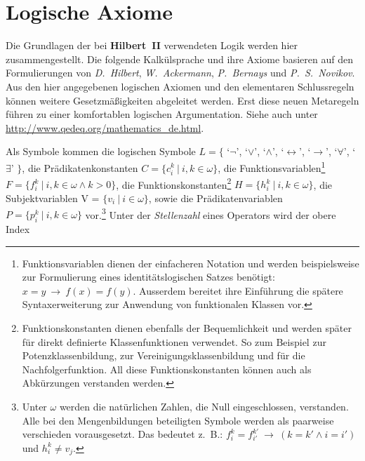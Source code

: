 \documentclass[a4paper,german,10pt,twoside]{book}
\newcommand{\impl}{\ \rightarrow \ }
\begin{document}
{\section{Logische Axiome} \label{Logische_Grundlagen}
Die Grundlagen der bei \textbf{Hilbert~II} verwendeten Logik werden hier zusammengestellt. Die
folgende Kalk{\"u}lsprache und ihre Axiome basieren auf den Formulierungen von \emph{D.~Hilbert},
\emph{W.~Ackermann}, \emph{P.~Bernays} und \emph{P.~S.~Novikov}. Aus den hier angegebenen logischen
Axiomen und den elementaren Schlussregeln k{\"o}nnen weitere Gesetzm{\"a}{\ss}igkeiten abgeleitet werden. Erst
diese neuen Metaregeln f{\"u}hren zu einer komfortablen logischen Argumentation. Siehe auch unter
\url{http://www.qedeq.org/mathematics_de.html}.
\par
Als Symbole kommen die logischen Symbole $L = \{$ \mbox{`$\neg$'}, \mbox{`$\vee$'},
\mbox{`$\wedge$'}, \mbox{`$\leftrightarrow$'}, \mbox{`$\rightarrow$'}, \mbox{`$\forall$'},
\mbox{`$\exists$'} $\}$, die
Pr{\"a}dikatenkonstanten $C = \{c^k_i~|~i, k
\in \omega\}$, die
Funktionsvariablen\footnote{Funktionsvariablen
dienen der einfacheren Notation und werden beispielsweise zur Formulierung eines
identit{\"a}tslogischen Satzes ben{\"o}tigt: $x = y \impl f(x) = f(y)$. Ausserdem bereitet ihre Einf{\"u}hrung
die sp{\"a}tere Syntaxerweiterung zur Anwendung von funktionalen Klassen vor.} $F = \{f^k_i~|~i, k \in
\omega \land k
> 0\}$, die
Funktionskonstanten\footnote{Funktionskonstanten
dienen ebenfalls der Bequemlichkeit und werden sp{\"a}ter f{\"u}r direkt definierte Klassenfunktionen
verwendet. So zum Beispiel zur Potenzklassenbildung, zur Vereinigungsklassenbildung und f{\"u}r die
Nachfolgerfunktion. All diese Funktionskonstanten k{\"o}nnen auch als Abk{\"u}rzungen verstanden werden.}
$H = \{h^k_i~|~i, k \in \omega\}$, die
Subjektvariablen V = $\{v_i~|~i \in \omega\}$,
sowie die Pr{\"a}dikatenvariablen $P =
\{p^k_i~|~i, k \in \omega\}$ vor.\footnote{Unter $\omega$ werden die nat{\"u}rlichen Zahlen, die Null
eingeschlossen, verstanden. Alle bei den Mengenbildungen beteiligten Symbole werden als paarweise
verschieden vorausgesetzt. Das bedeutet z.~B.: $f^k_i = f^{k'}_{i'} \impl (k = k' \land i = i')$
und $h^k_i \neq v_j$.} Unter der \emph{Stellenzahl} eines Operators wird der obere Index
}
\end{document}
